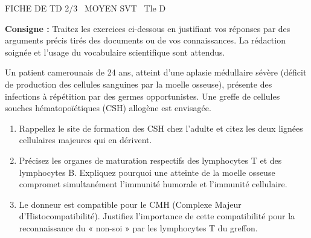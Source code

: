 \documentclass[11pt]{article}
\begin{document}
\begin{tcolorbox}[enhanced,colback=popink,colframe=popink,arc=10pt,boxrule=0pt,left=12pt,right=12pt,top=9pt,bottom=9pt]
{\color{white}\popxbold\small FICHE DE TD 2/3 \textbullet\ MOYEN \hfill SVT \textbullet\ Tle D\par}
\end{tcolorbox}
\vspace{4pt}
\noindent \textbf{Consigne :} Traitez les exercices ci-dessous en justifiant vos réponses par des arguments précis tirés des documents ou de vos connaissances. La rédaction soignée et l'usage du vocabulaire scientifique sont attendus.

\begin{exercice}
Un patient camerounais de 24 ans, atteint d'une aplasie médullaire sévère (déficit de production des cellules sanguines par la moelle osseuse), présente des infections à répétition par des germes opportunistes. Une greffe de cellules souches hématopoïétiques (CSH) allogène est envisagée.
\begin{enumerate}
    \item Rappellez le site de formation des CSH chez l'adulte et citez les deux lignées cellulaires majeures qui en dérivent.
    \item Précisez les organes de maturation respectifs des lymphocytes T et des lymphocytes B. Expliquez pourquoi une atteinte de la moelle osseuse compromet simultanément l'immunité humorale et l'immunité cellulaire.
    \item Le donneur est compatible pour le CMH (Complexe Majeur d'Histocompatibilité). Justifiez l'importance de cette compatibilité pour la reconnaissance du « non-soi » par les lymphocytes T du greffon.
\end{enumerate}
\end{exercice}
\end{document}
